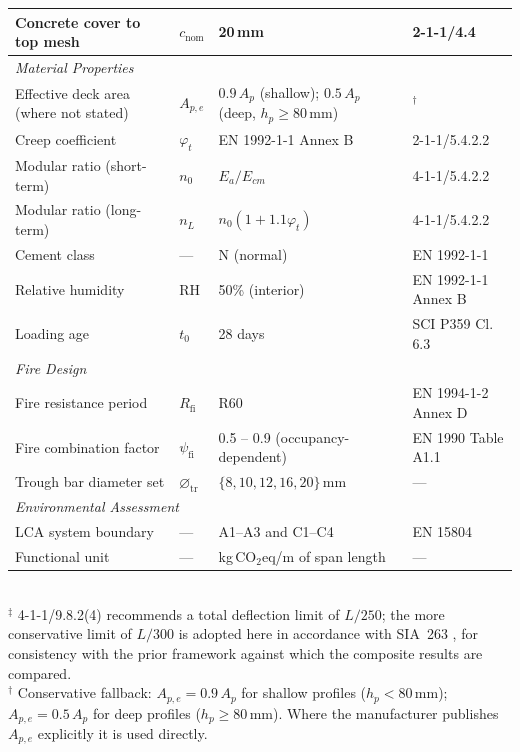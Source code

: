 \begin{table}[h!]
\begin{tabular}{p{6.5cm} p{1.8cm} p{2.8cm} p{3.0cm}}
Concrete cover to top mesh       & $c_\mathrm{nom}$ & 20\,mm                            & 2-1-1/4.4 \\
\hline
\multicolumn{4}{l}{\textit{Material Properties}} \\
\hline
Effective deck area (where not stated) & $A_{p,e}$ & $0.9\,A_p$ (shallow); $0.5\,A_p$ (deep, $h_p \ge 80$\,mm) & $^{\dagger}$ \\
Creep coefficient                & $\varphi_t$    & EN 1992-1-1 Annex B & 2-1-1/5.4.2.2 \\
Modular ratio (short-term)       & $n_0$          & $E_a / E_{cm}$ & 4-1-1/5.4.2.2 \\
Modular ratio (long-term)        & $n_L$          & $n_0(1 + 1.1\varphi_t)$ & 4-1-1/5.4.2.2 \\
Cement class                     & ---            & N (normal)              & EN 1992-1-1 \\
Relative humidity                & RH             & 50\% (interior)         & EN 1992-1-1 Annex B \\
Loading age                      & $t_0$          & 28 days                 & SCI P359 Cl.\,6.3 \\
\hline
\multicolumn{4}{l}{\textit{Fire Design}} \\
\hline
Fire resistance period           & $R_\mathrm{fi}$    & R60 & EN 1994-1-2 Annex D \\
Fire combination factor          & $\psi_\mathrm{fi}$ & 0.5 -- 0.9 (occupancy-dependent)        & EN 1990 Table A1.1 \\
Trough bar diameter set          & $\varnothing_\mathrm{tr}$ & $\{8, 10, 12, 16, 20\}$\,mm    & --- \\
\hline
\multicolumn{4}{l}{\textit{Environmental Assessment}} \\
\hline
LCA system boundary              & ---            & A1--A3 and C1--C4              & EN 15804 \\
Functional unit                  & ---            & kg\,CO$_2$eq/m of span length & --- \\
\hline
\end{tabular}
\vspace{4pt}\\
{\footnotesize
$^{\ddagger}$ 4-1-1/9.8.2(4) recommends a total deflection limit of $L/250$; the more conservative limit of $L/300$ is adopted here in accordance with SIA~263 \citep{RefWorks:sia263}, for consistency with the prior framework against which the composite results are compared.\\
$^{\dagger}$ Conservative fallback: $A_{p,e} = 0.9\,A_p$ for shallow profiles ($h_p < 80$\,mm); $A_{p,e} = 0.5\,A_p$ for deep profiles ($h_p \ge 80$\,mm). Where the manufacturer publishes $A_{p,e}$ explicitly it is used directly.
}
\end{table}

